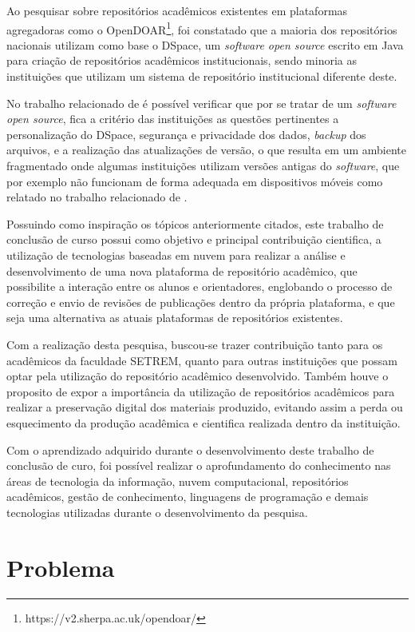 Ao pesquisar sobre repositórios acadêmicos existentes em plataformas
agregadoras como o OpenDOAR\footnote{https://v2.sherpa.ac.uk/opendoar/}, foi constatado que a maioria dos repositórios
nacionais utilizam como base o DSpace, um \emph{software open source}
escrito em Java para criação de repositórios acadêmicos institucionais,
sendo minoria as instituições que utilizam um sistema de repositório
institucional diferente deste.

No trabalho relacionado de \cite{GarciaRodrigoMoreira2019DdnB} é possível
verificar que por se tratar de um \emph{software open source},
fica a critério das instituições as questões pertinentes a personalização
do DSpace, segurança e privacidade dos dados, \emph{backup} dos arquivos,
e a realização das atualizações de versão, o que resulta em um ambiente
fragmentado onde algumas instituições utilizam versões antigas do \emph{software},
que por exemplo não funcionam de forma adequada em dispositivos móveis como
relatado no trabalho relacionado de \cite{FernandesMacedes:2018}.

Possuindo como inspiração os tópicos anteriormente citados,
este trabalho de conclusão de curso possui como objetivo e principal
contribuição cientifica, a utilização de tecnologias baseadas em
nuvem para realizar a análise e desenvolvimento de uma nova plataforma
de repositório acadêmico, que possibilite a interação entre os alunos
e orientadores, englobando o processo de correção e envio de revisões
de publicações dentro da própria plataforma, e que seja uma alternativa
as atuais plataformas de repositórios existentes.

Com a realização desta pesquisa, buscou-se trazer contribuição
tanto para os acadêmicos da faculdade SETREM, quanto para outras
instituições que possam optar pela utilização do repositório
acadêmico desenvolvido. Também houve o proposito de expor a
importância da utilização de repositórios acadêmicos para realizar
a preservação digital dos materiais produzido, evitando assim a perda
ou esquecimento da produção acadêmica e cientifica realizada dentro
da instituição.

Com o aprendizado adquirido durante o desenvolvimento deste trabalho
de conclusão de curo, foi possível realizar o aprofundamento do
conhecimento nas áreas de tecnologia da informação, nuvem computacional,
repositórios acadêmicos, gestão de conhecimento, linguagens de programação
e demais tecnologias utilizadas durante o desenvolvimento da pesquisa.

\section{Problema} \label{sec::Problem}

